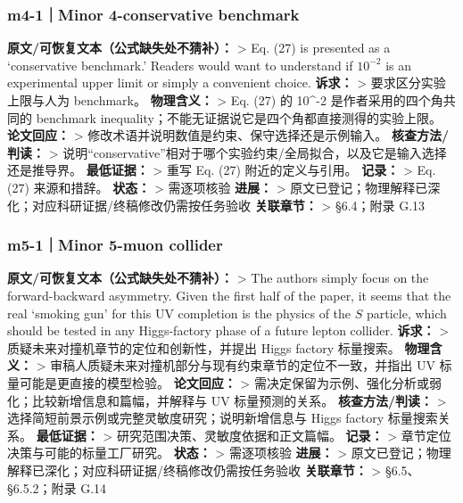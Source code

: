 \documentclass[
  chinese,
  UTF8]{ctexart}
\begin{document}
\subsubsection{m4-1｜Minor 4-conservative
benchmark}\label{m4-1minor-4-conservative-benchmark}

\textbf{原文/可恢复文本（公式缺失处不猜补）：} \textgreater{} Eq. (27)
is presented as a `conservative benchmark.' Readers would want to
understand if \(10^{-2}\) is an experimental upper limit or simply a
convenient choice. \textbf{诉求：} \textgreater{} 要求区分实验上限与人为
benchmark。 \textbf{物理含义：} \textgreater{} Eq. (27) 的 10\^{}-2
是作者采用的四个角共同的 benchmark
inequality；不能无证据说它是四个角都直接测得的实验上限。
\textbf{论文回应：} \textgreater{}
修改术语并说明数值是约束、保守选择还是示例输入。
\textbf{核查方法/判读：} \textgreater{}
说明``conservative''相对于哪个实验约束/全局拟合，以及它是输入选择还是推导界。
\textbf{最低证据：} \textgreater{} 重写 Eq. (27) 附近的定义与引用。
\textbf{记录：} \textgreater{} Eq. (27) 来源和措辞。 \textbf{状态：}
\textgreater{} 需逐项核验 \textbf{进展：} \textgreater{}
原文已登记；物理解释已深化；对应科研证据/终稿修改仍需按任务验收
\textbf{关联章节：} \textgreater{} §6.4；附录 G.13

\subsubsection{m5-1｜Minor 5-muon
collider}\label{m5-1minor-5-muon-collider}

\textbf{原文/可恢复文本（公式缺失处不猜补）：} \textgreater{} The
authors simply focus on the forward-backward asymmetry. Given the first
half of the paper, it seems that the real `smoking gun' for this UV
completion is the physics of the \(S\) particle, which should be tested
in any Higgs-factory phase of a future lepton collider. \textbf{诉求：}
\textgreater{} 质疑未来对撞机章节的定位和创新性，并提出 Higgs factory
标量搜索。 \textbf{物理含义：} \textgreater{}
审稿人质疑未来对撞机部分与现有约束章节的定位不一致，并指出 UV
标量可能是更直接的模型检验。 \textbf{论文回应：} \textgreater{}
需决定保留为示例、强化分析或弱化；比较新增信息和篇幅，并解释与 UV
标量预测的关系。 \textbf{核查方法/判读：} \textgreater{}
选择简短前景示例或完整灵敏度研究；说明新增信息与 Higgs factory
标量搜索关系。 \textbf{最低证据：} \textgreater{}
研究范围决策、灵敏度依据和正文篇幅。 \textbf{记录：} \textgreater{}
章节定位决策与可能的标量工厂研究。 \textbf{状态：} \textgreater{}
需逐项核验 \textbf{进展：} \textgreater{}
原文已登记；物理解释已深化；对应科研证据/终稿修改仍需按任务验收
\textbf{关联章节：} \textgreater{} §6.5、§6.5.2；附录 G.14
\end{document}
